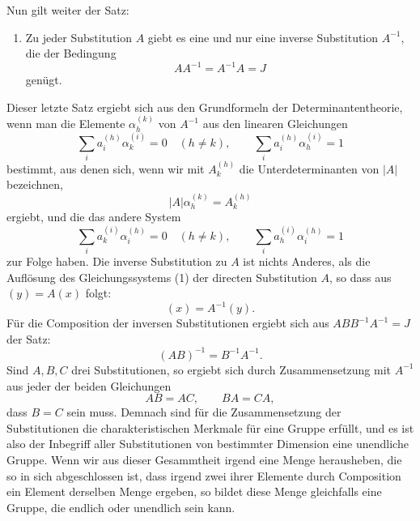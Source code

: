 \documentclass[11pt]{article}
\begin{document}
Nun gilt weiter der Satz:
\begin{enumerate}[label=\arabic*.,leftmargin=2.2em,start=6]
\item Zu jeder Substitution $A$ giebt es eine und nur eine inverse Substitution $A^{-1}$, die der Bedingung
\begin{equation}
AA^{-1}=A^{-1}A=J
\tag{15}
\end{equation}
genügt.
\end{enumerate}
Dieser letzte Satz ergiebt sich aus den Grundformeln der Determinantentheorie, wenn man die Elemente $\alpha_h^{(k)}$ von $A^{-1}$ aus den linearen Gleichungen
\begin{equation}
\sum_i a_i^{(h)}\alpha_k^{(i)}=0\quad(h\ne k),\qquad
\sum_i a_i^{(h)}\alpha_h^{(i)}=1
\tag{16}
\end{equation}
bestimmt, aus denen sich, wenn wir mit $A_k^{(h)}$ die Unterdeterminanten von $|A|$ bezeichnen,
\begin{equation}
|A|\alpha_h^{(k)}=A_k^{(h)}
\tag{17}
\end{equation}
ergiebt, und die das andere System
\begin{equation}
\sum_i a_k^{(i)}\alpha_i^{(h)}=0\quad(h\ne k),\qquad
\sum_i a_h^{(i)}\alpha_i^{(h)}=1
\tag{18}
\end{equation}
zur Folge haben. Die inverse Substitution zu $A$ ist nichts Anderes, als die Auflösung des Gleichungssystems (1) der directen Substitution $A$, so dass aus $(y)=A(x)$ folgt:
\begin{equation}
(x)=A^{-1}(y).
\tag{19}
\end{equation}
Für die Composition der inversen Substitutionen ergiebt sich aus $ABB^{-1}A^{-1}=J$ der Satz:
\begin{equation}
(AB)^{-1}=B^{-1}A^{-1}.
\tag{20}
\end{equation}
Sind $A,B,C$ drei Substitutionen, so ergiebt sich durch Zusammensetzung mit $A^{-1}$ aus jeder der beiden Gleichungen
\[
AB=AC,
\qquad
BA=CA,
\]
dass $B=C$ sein muss. Demnach sind für die Zusammensetzung der Substitutionen die charakteristischen Merkmale für eine Gruppe erfüllt, und es ist also der Inbegriff aller Substitutionen von bestimmter Dimension eine unendliche Gruppe. Wenn wir aus dieser Gesammtheit irgend eine Menge herausheben, die so in sich abgeschlossen ist, dass irgend zwei ihrer Elemente durch Composition ein Element derselben Menge ergeben, so bildet diese Menge gleichfalls eine Gruppe, die endlich oder unendlich sein kann.
\end{document}
